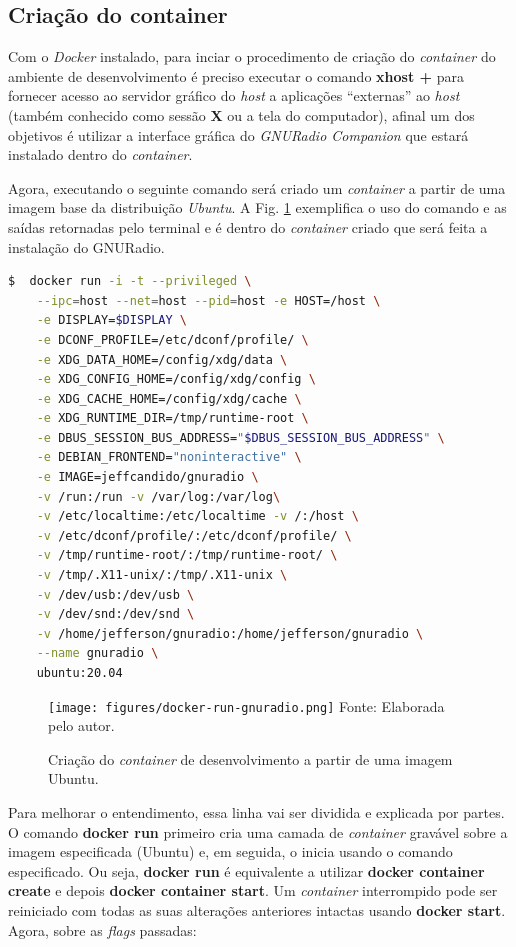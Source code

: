 \documentclass[
  12pt,				%
  openright,			%
  twoside,			%
  a4paper,			%
  english,			%
  french,				%
  spanish,			%
  brazil,				%
  ]{abntex2}
\begin{document}
\subsection*{Criação do container}

Com o \textit{Docker} instalado, para inciar o procedimento de criação do \textit{container} do ambiente de desenvolvimento é preciso executar o comando \textbf{xhost +}
para fornecer acesso ao servidor gráfico do \textit{host} a aplicações “externas” ao \textit{host} (também conhecido como sessão \textbf{X} ou a tela do computador),
afinal um dos objetivos é utilizar a interface gráfica do \textit{GNURadio Companion} que estará instalado dentro do \textit{container}.

Agora, executando o seguinte comando será criado um \textit{container} a partir de uma imagem base da distribuição \textit{Ubuntu}. A Fig.
\ref{fig:docker-run-gnuradio} exemplifica o uso do comando e as saídas retornadas pelo terminal e é dentro do \textit{container}
criado que será feita a instalação do GNURadio.

\begin{lstlisting}[language=bash]
$  docker run -i -t --privileged \
    --ipc=host --net=host --pid=host -e HOST=/host \
    -e DISPLAY=$DISPLAY \
    -e DCONF_PROFILE=/etc/dconf/profile/ \
    -e XDG_DATA_HOME=/config/xdg/data \
    -e XDG_CONFIG_HOME=/config/xdg/config \
    -e XDG_CACHE_HOME=/config/xdg/cache \
    -e XDG_RUNTIME_DIR=/tmp/runtime-root \
    -e DBUS_SESSION_BUS_ADDRESS="$DBUS_SESSION_BUS_ADDRESS" \
    -e DEBIAN_FRONTEND="noninteractive" \
    -e IMAGE=jeffcandido/gnuradio \
    -v /run:/run -v /var/log:/var/log\
    -v /etc/localtime:/etc/localtime -v /:/host \
    -v /etc/dconf/profile/:/etc/dconf/profile/ \
    -v /tmp/runtime-root/:/tmp/runtime-root/ \
    -v /tmp/.X11-unix/:/tmp/.X11-unix \
    -v /dev/usb:/dev/usb \
    -v /dev/snd:/dev/snd \
    -v /home/jefferson/gnuradio:/home/jefferson/gnuradio \
    --name gnuradio \
    ubuntu:20.04
  \end{lstlisting}


\begin{figure}[!htb]
  \centering
  \caption{Criação do \textit{container} de desenvolvimento a partir de uma imagem Ubuntu.}
  \texttt{[image: figures/docker-run-gnuradio.png]}
  Fonte: Elaborada pelo autor.
  \label{fig:docker-run-gnuradio}
\end{figure}

Para melhorar o entendimento, essa linha vai ser dividida e explicada por partes. O comando \textbf{docker run} primeiro cria uma camada de \textit{container}
gravável sobre a imagem especificada (Ubuntu) e, em seguida, o inicia usando o comando especificado. Ou seja, \textbf{docker run} é equivalente a utilizar
\textbf{docker container create} e depois \textbf{docker container start}. Um \textit{container} interrompido pode ser reiniciado com todas as suas alterações anteriores
intactas usando \textbf{docker start}. Agora, sobre as \textit{flags} passadas:
\end{document}
